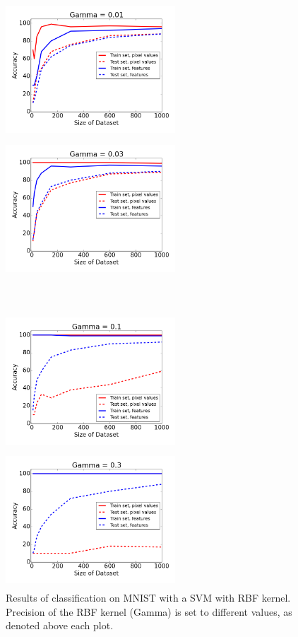 \documentclass{article}
\begin{document}
\begin{figure}[htb]
\centering
\begin{minipage}{0.36\textwidth}
\includegraphics[height=2in,width=2.5in]{svm001.png}
\end{minipage}%
\centering
\begin{minipage}{0.36\textwidth}
\includegraphics[height=2in,width=2.5in]{svm003.png}
\end{minipage}\\
\centering
\begin{minipage}{0.36\textwidth}
\includegraphics[height=2in,width=2.5in]{svm01.png}
\end{minipage}%
\centering
\begin{minipage}{0.36\textwidth}
\includegraphics[height=2in,width=2.5in]{svm03.png}
\end{minipage}
\caption{Results of classification on MNIST with a SVM with RBF kernel. Precision of the RBF kernel (Gamma) is set to different values, as denoted above each plot.}
\end{figure}
\end{document}

